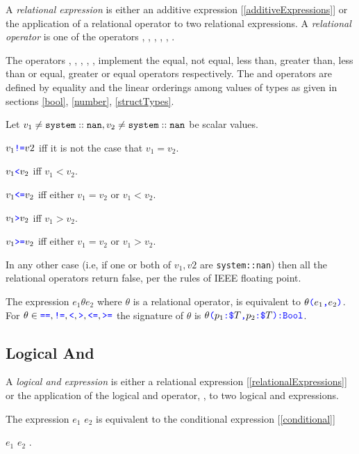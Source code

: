 \documentclass{article}
\begin{document}
{A {\em relational expression} is either an additive expression [\ref{additiveExpressions}] or the application of a relational operator to two relational expressions.
A {\em relational operator} is one of the operators \EQ{}, \NEQ{}, \LT{}, \GT{}, \LTE{}, \GTE{}.

The operators \EQ{}, \NEQ{}, \LT{}, \GT{}, \LTE{}, \GTE{} implement the equal, not equal,  less than, greater than,  less than or equal, greater or equal operators respectively. The \EQ{} and \LT{} operators are defined by equality and the linear orderings among values of types as given in sections \ref{bool}, \ref{number}, \ref{structTypes}.

Let $v_1 \ne {\tt system::nan}, v_2 \ne {\tt system::nan}$ be scalar values. 

$v_1 \texttt{\color{blue} !=}{} v2$ iff it is not the case that $v_1 = v_2$.

$v_1 \texttt{\color{blue} \tt<}{} v_2$ iff $v_1 < v_2$.

$v_1 \texttt{\color{blue} \tt<=}{} v_2$ iff either $v_1 = v_2$ or $v_1 < v_2$.

$v_1 \texttt{\color{blue} \tt>}{} v_2$ iff $v_1 > v_2$.

$v_1 \texttt{\color{blue} \tt>=}{} v_2$ iff either $v_1 = v_2$ or $v_1 > v_2$.

In any other case (i.e, if one or both of $v_1, v2$ are {\tt system::nan}) then all the relational operators return false, per the rules of IEEE floating point.

\RelExpression{}
\RelOp{}

The expression $e_1 \theta e_2$ where $\theta$ is a relational operator, is equivalent to $\theta\texttt{\color{blue} (}{}e_1\texttt{\color{blue} ,}{} e_2\texttt{\color{blue} )}$. For $\theta{} \in \texttt{\color{blue} ==}{}, \texttt{\color{blue} !=}{}, \texttt{\color{blue} \tt<}{}, \texttt{\color{blue} \tt>}{}, \texttt{\color{blue} \tt<=}{}, \texttt{\color{blue} \tt>=}{}$ the signature of $\theta$ is $\theta\texttt{\color{blue} (}{}p_1\texttt{\color{blue} :}{} \texttt{\color{blue} \$}{}T\texttt{\color{blue} ,}{} p_2\texttt{\color{blue} :}{} \texttt{\color{blue} \$}{}T\texttt{\color{blue} )}\texttt{\color{blue} :}{}\texttt{\color{blue} Bool}$.


\subsection{Logical And}
\label{logicalAnd}

A {\em logical and expression} is either a relational expression [\ref{relationalExpressions}] or the application of the logical and operator, \AND{}, to two logical and expressions.

\AndExpression{}

The expression $e_1$ \AND{} $e_2$ is equivalent to the conditional expression [\ref{conditional}] 

\IF{} $e_1$ \THEN{} $e_2$ \ELSE{} \FALSE{}.

}
\end{document}
